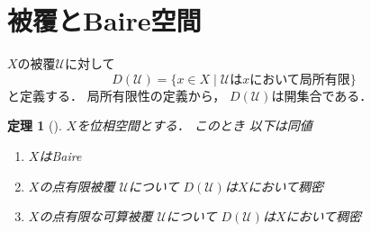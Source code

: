 \documentclass[leqno, 12pt]{jsarticle}
\newtheorem{thm}{定理}
\newcommand{\mycal}[1]{\mathcal{#1}}
\newcommand{\mydd}[1]{D(#1)}
\begin{document}
\section{被覆とBaire空間}
$X$の被覆$\mycal{U}$に対して
\[
\mydd{\mycal{U}}=\{x\in X\mid 
\text{$\mycal{U}$は$x$において局所有限}\}
\]
と定義する．
局所有限性の定義から，
$\mydd{\mycal{U}}$は開集合である．
\begin{thm}[\cite{Mc}]\label{thm:locfinite}
$X$を位相空間とする．
このとき
以下は同値
\begin{enumerate}
\item 
$X$はBaire
\item 
$X$の点有限被覆
$\mycal{U}$について
$\mydd{\mycal{U}}$は$X$において稠密
\item 
$X$の点有限な可算被覆
$\mycal{U}$について
$\mydd{\mycal{U}}$は$X$において稠密
\end{enumerate}
\end{thm}
\end{document}
